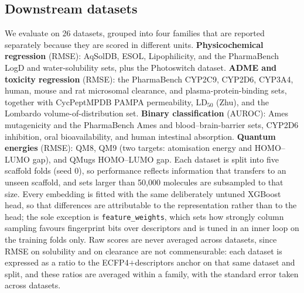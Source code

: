 \subsection{Downstream datasets}

We evaluate on 26 datasets, grouped into four families that are reported separately because they
are scored in different units. \textbf{Physicochemical regression} (RMSE): AqSolDB, ESOL,
Lipophilicity, and the PharmaBench LogD and water-solubility sets, plus the Photoswitch dataset.
\textbf{ADME and toxicity regression} (RMSE): the PharmaBench CYP2C9, CYP2D6, CYP3A4, human,
mouse and rat microsomal clearance, and plasma-protein-binding sets, together with CycPeptMPDB
PAMPA permeability, LD$_{50}$ (Zhu), and the Lombardo volume-of-distribution set.
\textbf{Binary classification} (AUROC): Ames mutagenicity and the PharmaBench Ames and
blood--brain-barrier sets, CYP2D6 inhibition, oral bioavailability, and human intestinal
absorption. \textbf{Quantum energies} (RMSE): QM8, QM9 (two targets: atomisation energy and
HOMO--LUMO gap), and QMugs HOMO--LUMO gap. Each dataset is split into five scaffold folds
(seed 0), so performance reflects information that transfers to an unseen scaffold, and sets
larger than 50{,}000 molecules are subsampled to that size. Every embedding is fitted with the
same deliberately untuned XGBoost head, so that differences are attributable to the
representation rather than to the head; the sole exception is \texttt{feature\_weights}, which
sets how strongly column sampling favours fingerprint bits over descriptors and is tuned in an
inner loop on the training folds only. Raw scores are never averaged across datasets, since RMSE
on solubility and on clearance are not commensurable: each dataset is expressed as a ratio to the
ECFP4$+$descriptors anchor on that same dataset and split, and these ratios are averaged within a
family, with the standard error taken across datasets.

